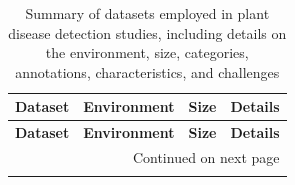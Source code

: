 \documentclass[sn-mathphys]{sn-jnl}
\theoremstyle{thmstyleone}%
\theoremstyle{thmstyletwo}%
\theoremstyle{thmstylethree}%
\begin{document}
\begin{footnotesize}
\begin{longtable}{@{}p{3cm}p{2cm}p{2cm}p{5cm}@{}}
\caption{Summary of datasets employed in plant disease detection studies, including details on the environment, size, categories, annotations, characteristics, and challenges}\label{tab:datasets} \\

  \toprule
  \textbf{Dataset} & \textbf{Environment} & \textbf{Size} & \textbf{Details} \\
  \midrule
  \endfirsthead

  \toprule
  \textbf{Dataset} & \textbf{Environment} & \textbf{Size} & \textbf{Details} \\
  \midrule
  \endhead

  \midrule
  \multicolumn{4}{r}{{Continued on next page}} \\
  \midrule
  \endfoot

  \bottomrule
  \endlastfoot


\end{longtable}
\end{footnotesize}
\end{document}
